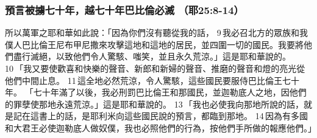 \subsubsection{預言被擄七十年，越七十年巴比倫必滅 （耶25:8-14）}
所以萬軍之耶和華如此說：「因為你們沒有聽從我的話， 9 我必召北方的眾族和我僕人巴比倫王尼布甲尼撒來攻擊這地和這地的居民，並四圍一切的國民。我要將他們盡行滅絕，以致他們令人驚駭、嗤笑，並且永久荒涼。」這是耶和華說的。 10 「我又要使歡喜和快樂的聲音、新郎和新婦的聲音、推磨的聲音和燈的亮光從他們中間止息。 11 這全地必然荒涼，令人驚駭，這些國民要服侍巴比倫王七十年。
「七十年滿了以後，我必刑罰巴比倫王和那國民，並迦勒底人之地，因他們的罪孽使那地永遠荒涼。」這是耶和華說的。 13 「我也必使我向那地所說的話，就是記在這書上的話，是耶利米向這些國民說的預言，都臨到那地。 14 因為有多國和大君王必使迦勒底人做奴僕，我也必照他們的行為，按他們手所做的報應他們。」


